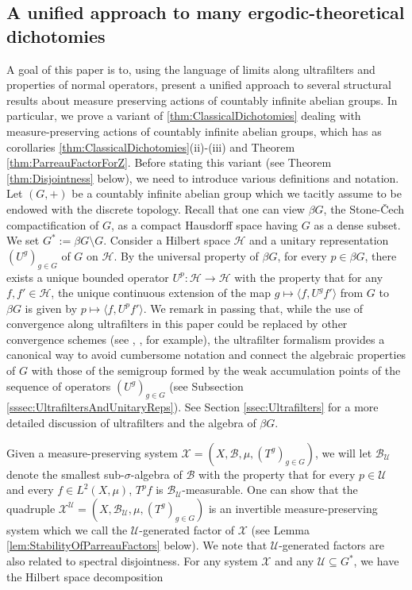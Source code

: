 \documentclass[graybox]{svmult}
\theoremstyle{definition}
\newcommand{\edit}[3]{\color{#1}{#3}\color{black}\marginpar{\textcolor{#1}{[[#2]]}}}
\newcommand{\jpm}[1]{\edit{ggreen}{JPM}{[[#1]]}}
\begin{document}
\subsection{A unified approach to many ergodic-theoretical dichotomies}
A goal of this paper is to, using the language of limits along ultrafilters and properties of normal operators, present a unified approach to several structural results about measure preserving actions of countably infinite abelian groups.
In particular, we prove a variant of   \cref{thm:ClassicalDichotomies} dealing with measure-preserving actions of countably infinite abelian groups, which has as corollaries
\cref{thm:ClassicalDichotomies}(ii)-(iii) and Theorem \ref{thm:ParreauFactorForZ}. 
Before stating this variant (see Theorem \ref{thm:Disjointness} below), we need to introduce various definitions and notation.\\

Let $(G,+)$ be a countably infinite abelian group which we tacitly assume to be endowed with the discrete topology. 
Recall that one can view $\beta G$, the Stone-{\v C}ech compactification of $G$, as  a compact Hausdorff space having $G$ as a dense subset. 
We set $G^*:=\beta G\setminus G$. 
Consider a Hilbert space $\mathcal H$ and a unitary representation $(U^g)_{g\in G}$ of $G$ on $\mathcal H$. 
By the universal property of $\beta G$, for every $p\in\beta G$, there exists a unique bounded operator $U^p:\mathcal H\rightarrow\mathcal H$ with the property that for any $f,f'\in\mathcal H$, the unique continuous extension of the map $g\mapsto \langle f,U^g f'\rangle$ from  $G$ to $\beta G$ is given by $p\mapsto \langle f, U^pf'\rangle$. 
We remark in passing that, while the use of convergence along ultrafilters in this paper could be replaced by other convergence schemes (see \cite[Section 9.2]{FBook}, \cite[Section 6]{AlmostMixingOfAllOrders}, for example), the ultrafilter formalism provides a canonical way to avoid cumbersome notation and connect the algebraic properties of $G$ with those of the semigroup formed by the weak accumulation points of the sequence of operators $(U^g)_{g\in G}$ (see Subsection \ref{sssec:UltrafiltersAndUnitaryReps}).
See Section \ref{ssec:Ultrafilters} for a more detailed discussion of ultrafilters and the algebra of $\beta G$.

Given a measure-preserving system $\mathcal X=(X,\mathscr{B},\mu,(T^g)_{g\in G})$,  we will let $\mathscr{B}_\mathcal U$ denote the smallest sub-$\sigma$-algebra of $\mathscr{B}$ with the property that for every $p\in\mathcal U$ and every $f\in L^2(X,\mu)$, $T^pf$ is $\mathscr{B}_\mathcal U$-measurable. 
One can show that the quadruple $\mathcal X^\mathcal U=(X,\mathscr{B}_\mathcal U,\mu,(T^g)_{g\in G})$ is an invertible measure-preserving system which we call the $\mathcal U$-generated factor of $\mathcal X$ (see Lemma \ref{lem:StabilityOfParreauFactors} below).
 We note that $\mathcal{U}$-generated factors are also related to spectral disjointness.
For any system $\mathcal{X}$ and any $\mathcal{U} \subseteq G^*$, we have the Hilbert space decomposition 
\end{document}
